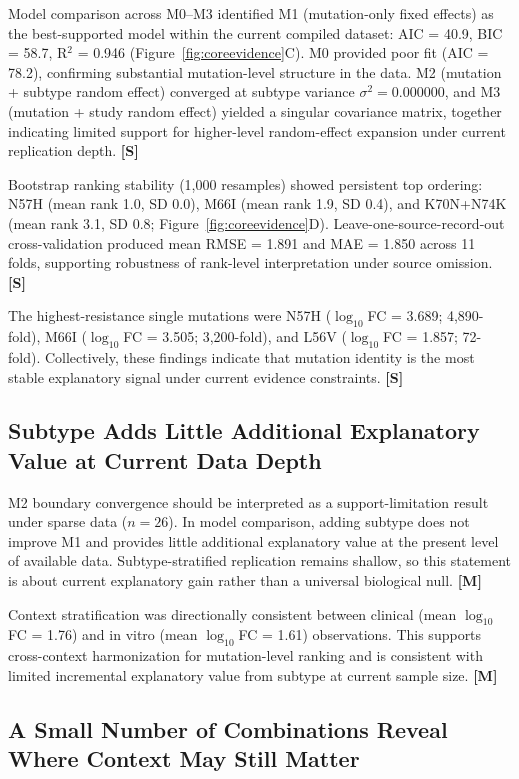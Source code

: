 \documentclass[preprint,authoryear]{elsarticle}
\newcommand{\claimlabel}[1]{\textbf{[#1]}}
\begin{document}
Model comparison across M0--M3 identified M1 (mutation-only fixed effects) as the best-supported model within the current compiled dataset: AIC = 40.9, BIC = 58.7, R$^{2}$ = 0.946 (Figure~\ref{fig:coreevidence}C). M0 provided poor fit (AIC = 78.2), confirming substantial mutation-level structure in the data. M2 (mutation + subtype random effect) converged at subtype variance $\sigma^2 = 0.000000$, and M3 (mutation + study random effect) yielded a singular covariance matrix, together indicating limited support for higher-level random-effect expansion under current replication depth. \claimlabel{S}

Bootstrap ranking stability (1,000 resamples) showed persistent top ordering: N57H (mean rank 1.0, SD 0.0), M66I (mean rank 1.9, SD 0.4), and K70N+N74K (mean rank 3.1, SD 0.8; Figure~\ref{fig:coreevidence}D). Leave-one-source-record-out cross-validation produced mean RMSE = 1.891 and MAE = 1.850 across 11 folds, supporting robustness of rank-level interpretation under source omission. \claimlabel{S}

The highest-resistance single mutations were N57H ($\log_{10}$FC = 3.689; 4,890-fold), M66I ($\log_{10}$FC = 3.505; 3,200-fold), and L56V ($\log_{10}$FC = 1.857; 72-fold). Collectively, these findings indicate that mutation identity is the most stable explanatory signal under current evidence constraints. \claimlabel{S}

\subsection{Subtype Adds Little Additional Explanatory Value at Current Data Depth}

M2 boundary convergence should be interpreted as a support-limitation result under sparse data ($n=26$). In model comparison, adding subtype does not improve M1 and provides little additional explanatory value at the present level of available data. Subtype-stratified replication remains shallow, so this statement is about current explanatory gain rather than a universal biological null. \claimlabel{M}

Context stratification was directionally consistent between clinical (mean $\log_{10}$FC = 1.76) and in vitro (mean $\log_{10}$FC = 1.61) observations. This supports cross-context harmonization for mutation-level ranking and is consistent with limited incremental explanatory value from subtype at current sample size. \claimlabel{M}

\subsection{A Small Number of Combinations Reveal Where Context May Still Matter}
\end{document}
